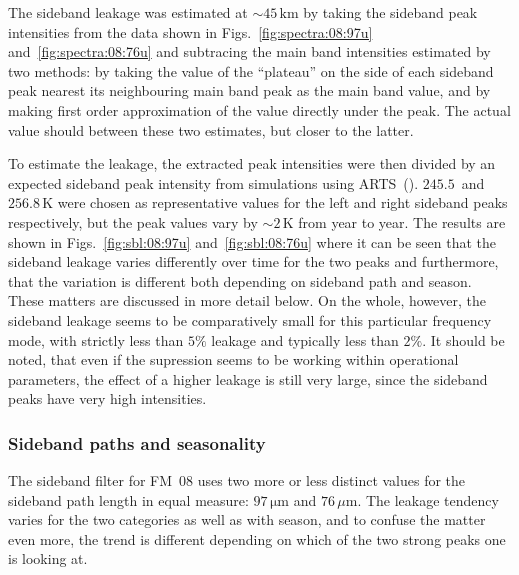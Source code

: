 \noindent
The sideband leakage was estimated at $\sim45\,\mathrm{km}$ by taking the
sideband peak intensities from the data shown in Figs.~\ref{fig:spectra:08:97u}
and~\ref{fig:spectra:08:76u} and subtracing the main band intensities estimated
by two methods:  by taking the value of the ``plateau'' on the side of each
sideband peak nearest its neighbouring main band peak as the main band value, and
by making first order approximation of the value directly under the peak.  The
actual value should between these two estimates, but closer to the latter.

To estimate the leakage, the extracted peak intensities were then divided by an
expected sideband peak intensity from simulations using
ARTS~(\cite{buehler:artst:05}).  $245.5$~and $256.8\,\mathrm{K}$ were chosen as
representative values for the left and right sideband peaks respectively, but
the peak values vary by $\sim2\,\mathrm{K}$ from year to year.  The results are
shown in Figs.~\ref{fig:sbl:08:97u} and~\ref{fig:sbl:08:76u} where it can be
seen that the sideband leakage varies differently over time for the two peaks
and furthermore, that the variation is different both depending on sideband
path and season.  These matters are discussed in more detail below.  On the
whole, however, the sideband leakage seems to be comparatively small for this
particular frequency mode, with strictly less than $5\%$ leakage and typically
less than $2\%$.  It should be noted, that even if the supression seems to be
working within operational parameters, the effect of a higher leakage is still
very large, since the sideband peaks have very high intensities.


\subsubsection{Sideband paths and seasonality}
\label{FM08:sbpath}
\label{FM08:seasonality}
The sideband filter for FM~08 uses two more or less distinct values for the
sideband path length in equal measure: $97\,\mathrm{\mu m}$ and
$76\,\mu\mathrm{m}$.  The leakage tendency varies for the two categories as
well as with season, and to confuse the matter even more, the trend is
different depending on which of the two strong peaks one is looking at.

